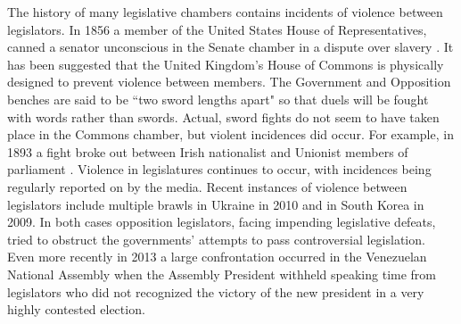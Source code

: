 \documentclass[a4paper]{article}\usepackage{graphicx, color}
\begin{document}
The history of many legislative chambers contains incidents of violence between legislators. In 1856 a member of the United States House of Representatives, canned a senator unconscious in the Senate chamber in a dispute over slavery \citep{USSenateCanning}. It has been suggested that the United Kingdom's House of Commons is physically designed to prevent violence between members. The Government and Opposition benches are said to be ``two sword lengths apart" \citep{ParliamentUKSword} so that duels will be fought with words rather than swords. Actual, sword fights do not seem to have taken place in the Commons chamber, but violent incidences did occur. For example, in 1893 a fight broke out between Irish nationalist and Unionist members of parliament \citep{ByrneViolence}. Violence in legislatures continues to occur, with incidences being regularly reported on by the media. Recent instances of violence between legislators include multiple brawls in Ukraine in 2010 and in South Korea in 2009. In both cases opposition legislators, facing impending legislative defeats, tried to obstruct the governments' attempts to pass controversial legislation. Even more recently in 2013 a large confrontation occurred in the Venezuelan National Assembly when the Assembly President withheld speaking time from legislators who did not recognized the victory of the new president in a very highly contested election.
\end{document}
